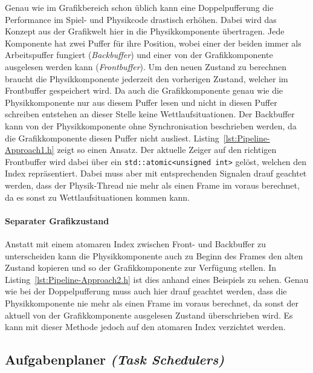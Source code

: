 \documentclass[12pt, a4paper, titlepage, hidelinks]{scrreprt}
\begin{document}
Genau wie im Grafikbereich schon üblich kann eine Doppelpufferung die Performance im Spiel- und Physikcode drastisch erhöhen. Dabei wird das Konzept aus der Grafikwelt hier in die Physikkomponente übertragen. Jede Komponente hat zwei Puffer für ihre Position, wobei einer der beiden immer als Arbeitspuffer fungiert (\textit{Backbuffer}) und einer von der Grafikkomponente ausgelesen werden kann (\textit{Frontbuffer}). Um den neuen Zustand zu berechnen braucht die Physikkomponente jederzeit den vorherigen Zustand, welcher im Frontbuffer gespeichert wird. Da auch die Grafikkomponente genau wie die Physikkomponente nur aus diesem Puffer lesen und nicht in diesen Puffer schreiben entstehen an dieser Stelle keine Wettlaufsituationen. Der Backbuffer kann von der Physikkomponente ohne Synchronisation beschrieben werden, da die Grafikkomponente diesen Puffer nicht ausliest. Listing~\autoref{lst:Pipeline-Approach1.h} zeigt so einen Ansatz. Der aktuelle Zeiger auf den richtigen Frontbuffer wird dabei über ein \texttt{std::atomic<unsigned int>} gelöst, welchen den Index repräsentiert. Dabei muss aber mit entsprechenden Signalen drauf geachtet werden, dass der Physik-Thread nie mehr als einen Frame im voraus berechnet, da es sonst zu Wettlaufsituationen kommen kann.


\clearpage

\paragraph{Separater Grafikzustand}

Anstatt mit einem atomaren Index zwischen Front- und Backbuffer zu unterscheiden kann die Physikkomponente auch zu Beginn des Frames den alten Zustand kopieren und so der Grafikkomponente zur Verfügung stellen. In Listing~\autoref{lst:Pipeline-Approach2.h} ist dies anhand eines Beispiels zu sehen. Genau wie bei der Doppelpufferung muss auch hier drauf geachtet werden, dass die Physikkomponente nie mehr als einen Frame im voraus berechnet, da sonst der aktuell von der Grafikkomponente ausgelesen Zustand überschrieben wird. Es kann mit dieser Methode jedoch auf den atomaren Index verzichtet werden.


\clearpage

\subsection{Aufgabenplaner \textit{(Task Schedulers)}}
\end{document}
